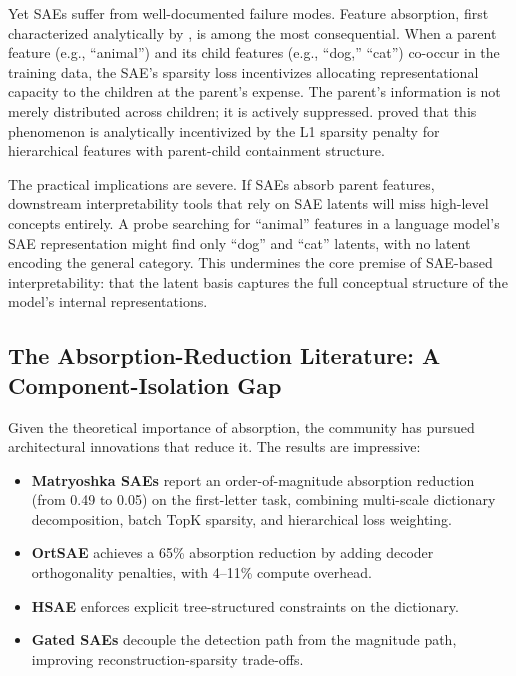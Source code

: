 \documentclass{article}
\begin{document}
Yet SAEs suffer from well-documented failure modes. Feature absorption, first characterized analytically by \citet{chanin2024feature}, is among the most consequential. When a parent feature (e.g., ``animal'') and its child features (e.g., ``dog,'' ``cat'') co-occur in the training data, the SAE's sparsity loss incentivizes allocating representational capacity to the children at the parent's expense. The parent's information is not merely distributed across children; it is actively suppressed. \citet{chanin2024feature} proved that this phenomenon is analytically incentivized by the L1 sparsity penalty for hierarchical features with parent-child containment structure.

The practical implications are severe. If SAEs absorb parent features, downstream interpretability tools that rely on SAE latents will miss high-level concepts entirely. A probe searching for ``animal'' features in a language model's SAE representation might find only ``dog'' and ``cat'' latents, with no latent encoding the general category. This undermines the core premise of SAE-based interpretability: that the latent basis captures the full conceptual structure of the model's internal representations.

\subsection{The Absorption-Reduction Literature: A Component-Isolation Gap}

Given the theoretical importance of absorption, the community has pursued architectural innovations that reduce it. The results are impressive:

\begin{itemize}
\item \textbf{Matryoshka SAEs} \citep{bussmann2025matryoshka} report an order-of-magnitude absorption reduction (from 0.49 to 0.05) on the first-letter task, combining multi-scale dictionary decomposition, batch TopK sparsity, and hierarchical loss weighting.
\item \textbf{OrtSAE} \citep{korznikov2025ortsae} achieves a 65\% absorption reduction by adding decoder orthogonality penalties, with 4--11\% compute overhead.
\item \textbf{HSAE} \citep{zhan2026hierarchical} enforces explicit tree-structured constraints on the dictionary.
\item \textbf{Gated SAEs} \citep{rajamanoharan2024jumprelu} decouple the detection path from the magnitude path, improving reconstruction-sparsity trade-offs.
\end{itemize}
\end{document}
